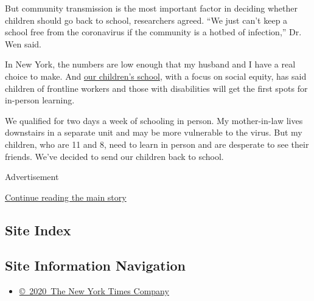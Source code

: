 But community transmission is the most important factor in deciding
whether children should go back to school, researchers agreed. ``We just
can't keep a school free from the coronavirus if the community is a
hotbed of infection,'' Dr. Wen said.

In New York, the numbers are low enough that my husband and I have a
real choice to make. And \href{https://www.communityroots.org/}{our
children's school}, with a focus on social equity, has said children of
frontline workers and those with disabilities will get the first spots
for in-person learning.

We qualified for two days a week of schooling in person. My
mother-in-law lives downstairs in a separate unit and may be more
vulnerable to the virus. But my children, who are 11 and 8, need to
learn in person and are desperate to see their friends. We've decided to
send our children back to school.

Advertisement

\protect\hyperlink{after-bottom}{Continue reading the main story}

\hypertarget{site-index}{%
\subsection{Site Index}\label{site-index}}

\hypertarget{site-information-navigation}{%
\subsection{Site Information
Navigation}\label{site-information-navigation}}

\begin{itemize}
\tightlist
\item
  \href{https://help.nytimes3xbfgragh.onion/hc/en-us/articles/115014792127-Copyright-notice}{©~2020~The
  New York Times Company}
\end{itemize}

